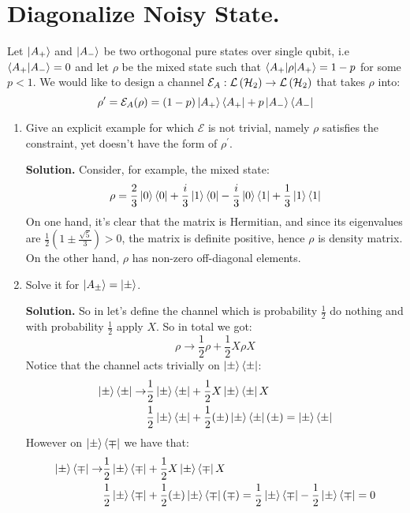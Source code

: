 \documentclass[12pt,a4paper]{article}
\begin{document}
\section{Diagonalize Noisy State.}
Let $\ket{A_{+}}$ and $\ket{A_{-}}$ be two orthogonal pure states over single qubit, i.e $\braket{A_{+} | A_{-}} = 0$ and let $\rho$ be the mixed state such that $\braket{A_{+}|\rho|A_{+}}  = 1 -p$ for some $p<1$. We would like to design a channel $\mathcal{E}_{A}: \mathcal{L}\left( \mathcal{H}_{2} \right) \rightarrow \mathcal{L}\left( \mathcal{H}_{2} \right) $ that takes $\rho$ into:
    $$\rho^\prime = \mathcal{E}_{A}(\rho) = (1-p)\ket{A_{+}}\bra{A_{+}} + p\ket{A_{-}}\bra{A_{-}}$$ 
\begin{enumerate}
    \item Give an explicit example for which $\mathcal{E}$ is not trivial, namely $\rho$ satisfies the constraint, yet doesn't have the form of $\rho^\prime$. 

    \textbf{Solution.} Consider, for example, the mixed state: 
    \begin{equation*}
        \rho = \frac{2}{3}\ket{0}\bra{0}+ \frac{i}{3}\ket{1}\bra{0} - \frac{i}{3}\ket{0}\bra{1}+ \frac{1}{3}\ket{1}\bra{1} 
    \end{equation*}
    On one hand, it's clear that the matrix is Hermitian, and since its eigenvalues are $\frac{1}{2}\left(1 \pm \frac{\sqrt{5}}{3} \right) > 0 $, the matrix is definite positive, hence $\rho$ is density matrix. 
    On the other hand, $\rho$ has non-zero off-diagonal elements.
    \item Solve it for $\ket{A_{\pm}} = \ket{\pm}$. 
    
    
    \textbf{Solution.} So in let's define the channel which is probability $\frac{1}{2}$ do nothing and with probability $\frac{1}{2}$ apply $X$. So in total we got: 
    \begin{equation*}
        \rho \rightarrow \frac{1}{2}\rho + \frac{1}{2}X\rho X 
    \end{equation*} 
    Notice that the channel acts trivially on $\ket{\pm}\bra{\pm}$:
    \begin{equation*}
    \begin{split}
        \ket{\pm}\bra{\pm} \rightarrow  &\frac{1}{2} \ket{\pm}\bra{\pm} + \frac{1}{2}X\ket{\pm}\bra{\pm}X \\
        & \frac{1}{2} \ket{\pm}\bra{\pm} + \frac{1}{2} (\pm ) \ket{\pm}\bra{\pm} (\pm) = \ket{\pm}\bra{\pm} 
    \end{split}
    \end{equation*}
    However on $\ket{\pm}\bra{\mp}$ we have that: 
\begin{equation*}
    \begin{split}
        \ket{\pm}\bra{\mp} \rightarrow  &\frac{1}{2} \ket{\pm}\bra{\mp} + \frac{1}{2}X\ket{\pm}\bra{\mp}X \\
        & \frac{1}{2} \ket{\pm}\bra{\mp} + \frac{1}{2} (\pm ) \ket{\pm}\bra{\mp} (\mp) = \frac{1}{2}\ket{\pm}\bra{\mp} - \frac{1}{2}\ket{\pm}\bra{\mp} = 0 
    \end{split}
    \end{equation*}


\end{enumerate}
\end{document}
